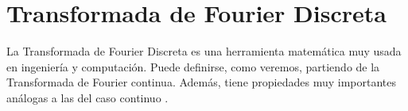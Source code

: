 \documentclass{article}
\begin{document}




\section{Transformada de Fourier Discreta} \label{sec:dft}

La Transformada de Fourier Discreta es una herramienta matemática muy usada en ingeniería y computación. Puede definirse, como veremos, partiendo de la Transformada de Fourier continua. Además, tiene propiedades muy importantes análogas a las del caso continuo \cite{bachmann2012fourier}.
\end{document}
